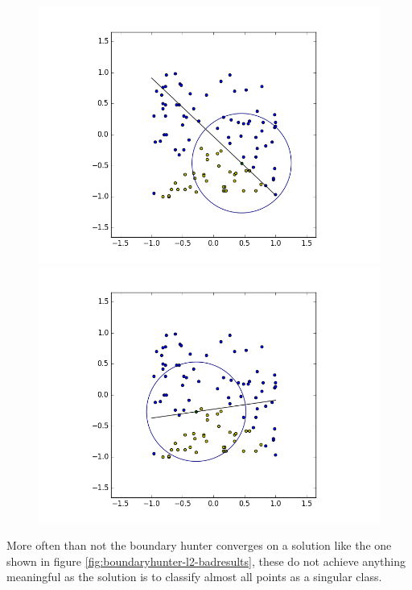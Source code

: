 \documentclass[notitlepage]{report}
\theoremstyle{definition}
\begin{document}
\begin{figure}[H]
  \centering
  \begin{minipage}[b]{0.4\textwidth}
    \includegraphics[width=\textwidth]{BoundaryHunter-Attempt3-R0.png}
    \caption{}
    \label{fig:boundaryhunter-l2-good1}
  \end{minipage}
  \hfill
  \begin{minipage}[b]{0.4\textwidth}
    \includegraphics[width=\textwidth]{BoundaryHunter-Attempt3-R1.png}
    \caption{}
    \label{fig:boundaryhunter-l2-good2}
  \end{minipage}
  \hfill
\end{figure}

More often than not the boundary hunter converges on a solution like the one shown in figure \ref{fig:boundaryhunter-l2-badresults}, these do not achieve anything meaningful as the solution is to classify almost all points as a singular class.
\end{document}
